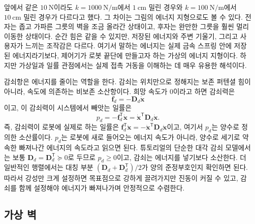 

앞에서 같은 $10~\mathrm{N}$이라도 $k=1000~\mathrm{N/m}$에서 $1~\mathrm{cm}$ 밀린 경우와 $k=100~\mathrm{N/m}$에서 $10~\mathrm{cm}$ 밀린 경우가 다르다고 했다.
그 차이는 그림의 에너지 지형으로도 볼 수 있다.
전자는 좁고 가파른 그릇의 벽을 조금 올라간 상태이고, 후자는 완만한 그릇을 훨씬 멀리 이동한 상태이다.
순간 힘은 같을 수 있지만, 저장된 에너지와 주변 기울기, 그리고 사용자가 느끼는 조작감은 다르다.
여기서 말하는 에너지는 실제 금속 스프링 안에 저장된 에너지라기보다, 제어기가 로봇 끝단에 만들고자 하는 가상의 에너지 지형이다.
하지만 가상일과 일률 관점에서는 실제 접촉 거동을 이해하는 데 매우 유용한 해석이다.

감쇠항은 에너지를 줄이는 역할을 한다.
감쇠는 위치만으로 정해지는 보존 퍼텐셜 힘이 아니라, 속도에 의존하는 비보존 소산항이다.
희망 속도가 0이라고 하면 감쇠력은
\begin{equation}
  \bm{f}_d=-\bm{D}_d\dot{\bm{x}}
\end{equation}
이고, 이 감쇠력이 시스템에서 빼앗는 일률은
\begin{equation}
  p_d
  =
  -\bm{f}_d^{\mathsf{T}}\dot{\bm{x}}
  =
  \dot{\bm{x}}^{\mathsf{T}}\bm{D}_d\dot{\bm{x}}.
\end{equation}
즉, 감쇠력이 로봇에 실제로 하는 일률은 $\bm{f}_d^{\mathsf{T}}\dot{\bm{x}}=-\dot{\bm{x}}^{\mathsf{T}}\bm{D}_d\dot{\bm{x}}$이고, 여기서 $p_d$는 양수로 정의한 소산률이다.
$p_d$는 로봇에 새로 들어오는 에너지 속도가 아니라, 양수로 세기로 약속한 빠져나간 에너지의 속도라고 읽으면 된다.
튜토리얼의 단순한 대각 감쇠 모델에서는 보통 $\bm{D}_d=\bm{D}_d^{\mathsf{T}}\succeq0$로 두므로 $p_d\ge0$이고, 감쇠는 에너지를 넣기보다 소산한다.
더 일반적인 행렬에서는 대칭 부분 $(\bm{D}_d+\bm{D}_d^{\mathsf{T}})/2$가 양의 준정부호인지 확인하면 된다.
따라서 강성만 크게 설정하면 목표점으로 강하게 끌려가지만 진동이 커질 수 있고, 감쇠를 함께 설정해야 에너지가 빠져나가며 안정적으로 수렴한다.

\subsection{가상 벽}

